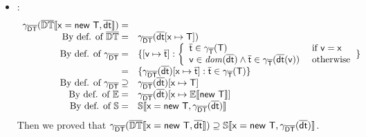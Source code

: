 \documentclass{llncs}
\begin{document}
\begin{lemma}
\begin{itemize}
\item {}: 
\[
\begin{array}{rl}
\gamma_{\mathsf{\overline{DT}}} (\mathbb{\overline{\mathit{\mathbb{DT}}}}\llbracket \mathtt{\mathsf{x = new\ T}, \mathsf{\overline{dt}}} \rrbracket)= &\\
\textrm{By def. of } \overline{\mathit{\mathbb{DT}}} = & \gamma_{\mathsf{\overline{DT}}} (\mathsf{\overline{dt}}[\mathsf{x} \mapsto \mathsf{T}])\\
\textrm{By def. of } \gamma_{\mathsf{\overline{DT}}} = & \{[\mathsf{v} \mapsto \mathsf{\overline{t}}] : \left\{
\begin{array}{ll}
\mathsf{\overline{t}} \in \gamma_{\mathsf{\overline{T}}}(\mathsf{T}) &\textrm{ if }\mathsf{v}=\mathsf{x}\\
\mathsf{v} \in \mathit{dom}(\mathsf{\overline{dt}}) \land \mathsf{\overline{t}} \in \gamma_{\mathsf{\overline{T}}}(\mathsf{\overline{dt}}(\mathsf{v})) &\textrm{ otherwise}
\end{array}
\right.
\}\\
 = & \{\gamma_{\mathsf{\overline{DT}}}(\mathsf{\overline{dt}})[\mathsf{x} \mapsto \mathsf{\overline{t}}] : \mathsf{\overline{t}} \in \gamma_{\mathsf{\overline{T}}}(\mathsf{T})\}\\
\textrm{By def. of } \gamma_{\mathsf{\overline{DT}}} \supseteq & \gamma_{\mathsf{\overline{DT}}}(\mathsf{\overline{dt}})[\mathsf{x} \mapsto \mathsf{T}]\\
\textrm{By def. of }\mathit{\mathbb{E}} = & \gamma_{\mathsf{\overline{DT}}}(\mathsf{\overline{dt}})[\mathsf{x} \mapsto \mathbb{E}\llbracket \mathtt{\mathsf{new\ T}} \rrbracket]\\
\textrm{By def. of }\mathit{\mathbb{S}} = & \mathbb{S}\llbracket \mathtt{\mathsf{x = new\ T}, \gamma_{\mathsf{\overline{DT}}}(\mathsf{\overline{dt}})} \rrbracket\\
\end{array}
\]
Then we proved that $\gamma_{\mathsf{\overline{DT}}} (\mathbb{\overline{\mathit{\mathbb{DT}}}}\llbracket \mathtt{\mathsf{x = new\ T}, \mathsf{\overline{dt}}} \rrbracket) \supseteq \mathbb{S}\llbracket \mathtt{\mathsf{x = new\ T}, \gamma_{\mathsf{\overline{DT}}}(\mathsf{\overline{dt}})} \rrbracket$.


\end{itemize}
\end{lemma}
\end{document}

